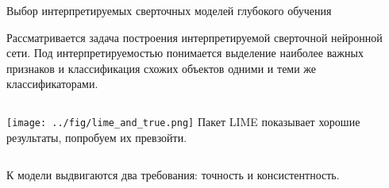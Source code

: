 \documentclass{beamer}
\begin{document}
\begin{frame}{Выбор интерпретируемых сверточных моделей глубокого обучения}

Рассматривается задача построения интерпретируемой сверточной нейронной сети. Под интерпретируемостью понимается выделение наиболее важных признаков и классификация схожих объектов одними и теми же классификаторами.

\begin{columns}[c]
 \texttt{[image: ../fig/lime\_and\_true.png]}
    Пакет LIME показывает хорошие результаты, попробуем их превзойти.
\end{columns}

\bigskip
К модели выдвигаются два требования: {\color{red}точность} и {\color{red}консистентность}.
\end{frame}
\end{document}
